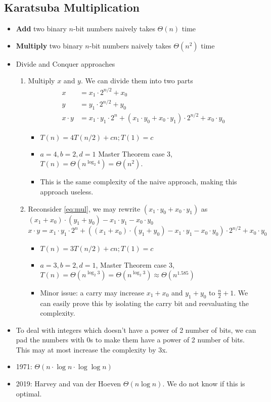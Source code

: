 \documentclass[a4paper]{article}
\begin{document}
\subsection{Karatsuba Multiplication}
\begin{itemize}
    \item \textbf{Add} two binary $n$-bit numbers naively takes $\Theta(n)$ time
    \item \textbf{Multiply} two binary $n$-bit numbers naively takes $\Theta(n^2)$ time
    \item Divide and Conquer approaches \begin{enumerate}
        \item Multiply $x$ and $y$. We can divide them into two parts\begin{align}
            x &= x_1\cdot 2^{n/2} + x_0\\
            y &= y_1\cdot 2^{n/2} + y_0\\
            x\cdot y &= x_1\cdot y_1\cdot 2^n + (x_1\cdot y_0 + x_0\cdot y_1)\cdot 2^{n/2} + x_0\cdot y_0 \label{eq:mul}
        \end{align}
        \begin{itemize}
            \item $T(n)=4T(n/2)+cn; T(1)=c$
            \item $a=4,b=2,d=1$ Master Theorem case 3, $T(n)=\Theta(n^{\log_2 4})=\Theta(n^2)$.
            \item This is the same complexity of the naive approach, making this approach useless.
        \end{itemize}
        
        \item Reconsider \eqref{eq:mul}, we may rewrite $(x_1\cdot y_0+x_0\cdot y_1)$ as $(x_1+x_0)\cdot(y_1+y_0)-x_1\cdot y_1-x_0\cdot y_0$
        \begin{equation}
            x\cdot y = x_1\cdot y_1\cdot 2^n + ((x_1+x_0)\cdot(y_1+y_0)-x_1\cdot y_1-x_0\cdot y_0)\cdot 2^{n/2} + x_0\cdot y_0
        \end{equation}
         
        \begin{itemize}
            \item $T(n)=3T(n/2)+cn; T(1)=c$
            \item $a=3,b=2,d=1$, Master Theorem case 3, $T(n)=\Theta(n^{\log_2 3})=\Theta(n^{\log_2 3})\approx\Theta(n^{1.585})$
            \item Minor issue: a carry may increase $x_1+x_0$ and $y_1+y_0$ to $\frac{n}{2} + 1$. We can easily prove this by isolating the carry bit and reevaluating the complexity.
        \end{itemize}
    \end{enumerate}
    \item To deal with integers which doesn't have a power of 2 number of bits, we can pad the numbers with 0s to make them have a power of 2 number of bits. This may at most increase the complexity by 3x.
    \item 1971: $\Theta(n\cdot\log n\cdot \log\log n)$
    \item 2019: Harvey and van der Hoeven $\Theta(n\log n)$. We do not know if this is optimal.
\end{itemize}
\end{document}
